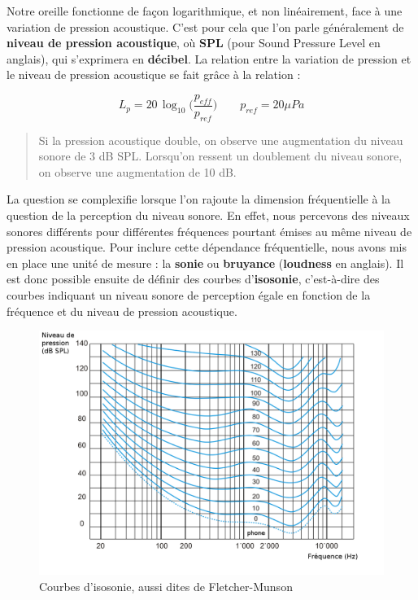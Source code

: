 \documentclass[
]{book}
\begin{document}
Notre oreille fonctionne de façon logarithmique, et non linéairement, face à une variation de pression acoustique. C'est pour cela que l'on parle généralement de \textbf{niveau de pression acoustique}, où \textbf{SPL} (pour Sound Pressure Level en anglais), qui s'exprimera en \textbf{décibel}. La relation entre la variation de pression et le niveau de pression acoustique se fait grâce à la relation :

\[L_p = 20\,\log_{10}\Big(\frac{p_{eff}}{p_{ref}}\Big) \qquad p_{ref} = 20\mu Pa\]

\begin{quote}
Si la pression acoustique double, on observe une augmentation du niveau sonore de 3 dB SPL. Lorsqu'on ressent un doublement du niveau sonore, on observe une augmentation de 10 dB.
\end{quote}

La question se complexifie lorsque l'on rajoute la dimension fréquentielle à la question de la perception du niveau sonore. En effet, nous percevons des niveaux sonores différents pour différentes fréquences pourtant émises au même niveau de pression acoustique. Pour inclure cette dépendance fréquentielle, nous avons mis en place une unité de mesure : la \textbf{sonie} ou \textbf{bruyance} (\textbf{loudness} en anglais). Il est donc possible ensuite de définir des courbes d'\textbf{isosonie}, c'est-à-dire des courbes indiquant un niveau sonore de perception égale en fonction de la fréquence et du niveau de pression acoustique.

\begin{figure}

{\centering \includegraphics[width=1\linewidth]{_resources/diagrams/Courbes_isosonie} 

}

\caption{Courbes d'isosonie, aussi dites de Fletcher-Munson}\label{fig:unnamed-chunk-7}
\end{figure}
\end{document}

